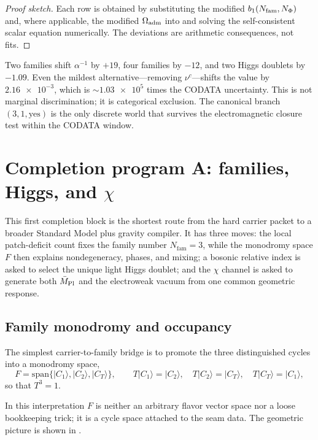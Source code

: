 \begin{proof}[Proof sketch]
Each row is obtained by substituting the modified $b_1(N_{\mathrm{fam}},N_\Phi)$ and, where applicable, the modified $\Omega_{\mathrm{adm}}$ into  and solving the self-consistent scalar equation numerically. The deviations are arithmetic consequences, not fits.
\end{proof}

\begin{remark}
Two families shift $\alpha^{-1}$ by $+19$, four families by $-12$, and two Higgs doublets by $-1.09$. Even the mildest alternative---removing $\nu^c$---shifts the value by $\num{2.16e-3}$, which is $\sim\num{1.03e5}$ times the CODATA uncertainty. This is not marginal discrimination; it is categorical exclusion. The canonical branch $(3,1,\text{yes})$ is the only discrete world that survives the electromagnetic closure test within the CODATA window.
\end{remark}

\section{Completion program A: families, Higgs, and \texorpdfstring{$\chi$}{chi}}

This first completion block is the shortest route from the hard carrier packet to a broader Standard Model plus gravity compiler. It has three moves: the local patch-deficit count fixes the family number $N_{\mathrm{fam}}=3$, while the monodromy space $F$ then explains nondegeneracy, phases, and mixing; a bosonic relative index is asked to select the unique light Higgs doublet; and the $\chi$ channel is asked to generate both $\bar M_{\mathrm{Pl}}$ and the electroweak vacuum from one common geometric response.

\subsection{Family monodromy and occupancy}

\begin{construction}
The simplest carrier-to-family bridge is to promote the three distinguished cycles into a monodromy space,
\[
F=\mathrm{span}\{|C_1\rangle,|C_2\rangle,|C_T\rangle\},
\qquad
T|C_1\rangle=|C_2\rangle,\quad
T|C_2\rangle=|C_T\rangle,\quad
T|C_T\rangle=|C_1\rangle,
\]
so that $T^3=1$.
\end{construction}
In this interpretation $F$ is neither an arbitrary flavor vector space nor a loose bookkeeping trick; it is a cycle space attached to the seam data. The geometric picture is shown in .

